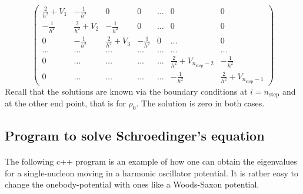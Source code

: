 \documentclass[%
twoside,                 %
final,                   %
10pt]{article}
\begin{document}
\begin{equation}
    \left( \begin{array}{ccccccc} \frac{2}{h^2}+V_1 & -\frac{1}{h^2} & 0   & 0    & \dots  &0     & 0 \\
                                -\frac{1}{h^2} & \frac{2}{h^2}+V_2 & -\frac{1}{h^2} & 0    & \dots  &0     &0 \\
                                0   & -\frac{1}{h^2} & \frac{2}{h^2}+V_3 & -\frac{1}{h^2}  &0       &\dots & 0\\
                                \dots  & \dots & \dots & \dots  &\dots      &\dots & \dots\\
                                0   & \dots & \dots & \dots  &\dots       &\frac{2}{h^2}+V_{n_{\mathrm{step}}-2} & -\frac{1}{h^2}\\
                                0   & \dots & \dots & \dots  &\dots       &-\frac{1}{h^2} & \frac{2}{h^2}+V_{n_{\mathrm{step}}-1}

             \end{array} \right)  
\label{eq:matrixse} 
\end{equation} 
Recall that the solutions are known via the boundary conditions at
$i=n_{\mathrm{step}}$ and at the other end point, that is for  $\rho_0$.
The solution is zero in both cases.




\subsection*{Program to solve Schroedinger's equation}

\paragraph{}
The following c++ program is an example of how one can obtain the eigenvalues for a single-nucleon moving in a harmonic oscillator potential. It is rather easy to change the onebody-potential with ones like a Woods-Saxon potential. 
\end{document}
